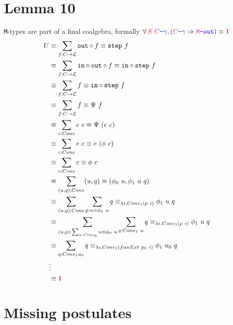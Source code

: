 \documentclass[twoside,11pt,openright]{report}
\newcommand*{\term}[1]{\textcolor{blue!80!black}{#1}}
\newcommand*{\type}[1]{\textcolor{magenta!90!black}{#1}}
\newcommand*{\container}[1]{\textcolor{red}{#1}}
\newcommand*{\unit}{\type{\textbf{1}}}
\newcommand*{\coalg}[2]{#1\texttt{-}#2}
\begin{document}
\section{Lemma 10}
\texttt{M}-types are part of a final coalgebra, formally \(\forall\,\container{S}~\coalg{\type{C}}{\term{\gamma}}, (\coalg{\type{C}}{\term{\gamma}} \Rightarrow \coalg{\type{\mathtt{M}}}{\term{\mathtt{out}}}) \equiv \unit\)
\begin{align}
  U &\equiv \sum_{f : C \rightarrow \mathcal{L}} \mathtt{out} \circ f \equiv \mathtt{step}~f \\
    &\equiv \sum_{f : C \rightarrow \mathcal{L}} \mathtt{in} \circ \mathtt{out} \circ f \equiv \mathtt{in} \circ \mathtt{step}~f\\
    &\equiv \sum_{f : C \rightarrow \mathcal{L}} f \equiv \mathtt{in} \circ \mathtt{step}~f\\
    &\equiv \sum_{f : C \rightarrow \mathcal{L}} f \equiv \Psi~f\\
    &\equiv \sum_{c : Cone} e~c \equiv \Psi~(e~c)\\
    &\equiv \sum_{c : Cone} e~c \equiv e~(\phi~c) \\
    &\equiv \sum_{c : Cone} c \equiv \phi~c \\
    &\equiv \sum_{(u,q) : Cone} (u , q) \equiv (\phi_0~u , \phi_1~u~q) \\
    &\equiv \sum_{(u,q) : Cone} \sum_{p : u \equiv \phi_0~u} q \equiv_{\lambda i, Cone_1 (p~i)} \phi_1~u~q \\
    &\equiv \sum_{(u,p) : \sum_{u : Cone_0} u \equiv \phi_0~u} \sum_{q : Cone_1~u} q \equiv_{\lambda i, Cone_1 (p~i)} \phi_1~u~q \\
    &\equiv \sum_{q : Cone_1 u_0} q \equiv_{\lambda i, Cone_1 (funExt~p_0~i)} \phi_1~u_0~q \\
    &\vdots \\
    &\equiv \unit
\end{align}

\section{Missing postulates}
\end{document}

